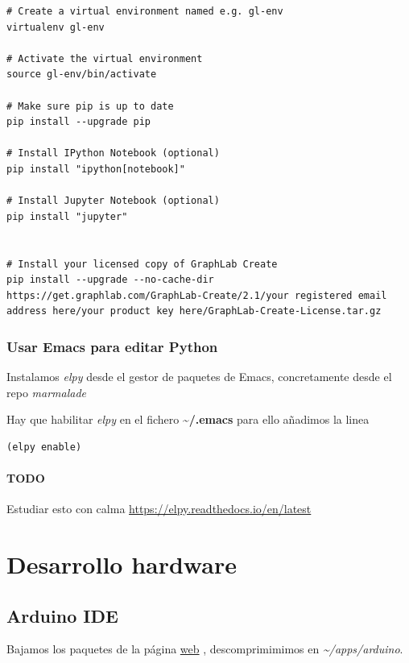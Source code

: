\documentclass[12pt,spanish,]{article}
\let\oldparagraph\paragraph
\renewcommand{\paragraph}[1]{\oldparagraph{#1}\mbox{}}
\begin{document}
\begin{verbatim}
# Create a virtual environment named e.g. gl-env
virtualenv gl-env

# Activate the virtual environment
source gl-env/bin/activate

# Make sure pip is up to date
pip install --upgrade pip

# Install IPython Notebook (optional)
pip install "ipython[notebook]"

# Install Jupyter Notebook (optional)
pip install "jupyter"


# Install your licensed copy of GraphLab Create
pip install --upgrade --no-cache-dir https://get.graphlab.com/GraphLab-Create/2.1/your registered email address here/your product key here/GraphLab-Create-License.tar.gz
\end{verbatim}

\subsubsection{Usar Emacs para editar
Python}\label{usar-emacs-para-editar-python}

Instalamos \emph{elpy} desde el gestor de paquetes de Emacs,
concretamente desde el repo \emph{marmalade}

Hay que habilitar \emph{elpy} en el fichero
\textbf{\textasciitilde{}/.emacs} para ello añadimos la linea

\begin{verbatim}
(elpy enable)
\end{verbatim}

\paragraph{TODO}\label{todo}

Estudiar esto con calma \url{https://elpy.readthedocs.io/en/latest}

\section{Desarrollo hardware}\label{desarrollo-hardware}

\subsection{Arduino IDE}\label{arduino-ide}

Bajamos los paquetes de la página \href{https://www.arduino.cc}{web} ,
descomprimimimos en \emph{\textasciitilde{}/apps/arduino}.
\end{document}
